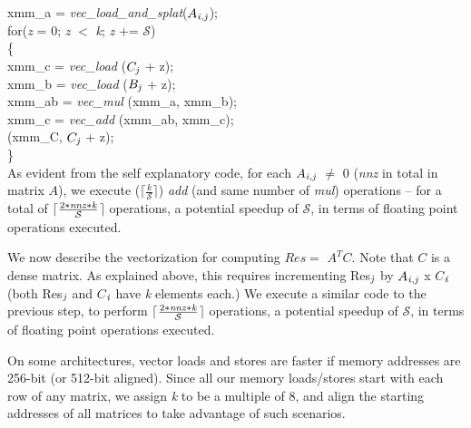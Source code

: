      \hspace*{-0.0in}xmm\_a = {\it{vec\_load\_and\_splat}}($A_{{\it{i}},{\it{j}}}$); \\
     for\hspace*{0.02in}({\it{z}} = 0; {\it{z}} $<$ {\it{k}}; {\it{z}} += $\mathcal{S}$)\\
     \{\\
         \hspace*{0.2in}xmm\_c = {\it{vec\_load}}  ($C_{{\it{j}}}$ + z); \\
         \hspace*{0.2in}xmm\_b = {\it{vec\_load}}  ($B_{{\it{j}}}$ + z); \\
         \hspace*{0.2in}xmm\_ab = {\it{vec\_mul}}  (xmm\_a, xmm\_b); \\
         \hspace*{0.2in}xmm\_c = {\it{vec\_add}}  (xmm\_ab, xmm\_c); \\
          (xmm\_C,  $C_{{\it{j}}}$ + z); \\
     \}\\

     As evident from the self explanatory code, for each
     $A_{{\it{i}},{\it{j}}}$ $\neq$ 0 ({\it{nnz}} in total in matrix $A$), 
     we execute ($\lceil$$\frac{k}{\mathcal{S}}$$\rceil$) 
     {\it{add}} (and same number of {\it{mul}}) operations -- for a
     total of
     $\lceil$$\frac{2*{\it{nnz}}*{\it{k}}}{\mathcal{S}}$$\rceil$ operations,
     a potential speedup of $\mathcal{S}$,  
     in terms of floating point operations executed.

     We now describe the vectorization for computing $Res =$ $A^TC$.
     Note that $C$ is a dense matrix. As explained above, this
     requires incrementing Res$_{{\it{j}}}$ 
     by $A_{{\it{i}},{\it{j}}}$ x $C$$_{{\it{i}}}$ 
     (both Res$_{{\it{j}}}$ and $C$$_{{\it{i}}}$ have {\it{k}} elements each.)
    We execute a similar code to the previous step, to perform 
    $\lceil$$\frac{2*{\it{nnz}}*{\it{k}}}{\mathcal{S}}$$\rceil$
    operations,
    a potential speedup of $\mathcal{S}$,
    in terms of floating point operations executed.

    On some architectures, vector loads and stores are faster if
    memory addresses are 256-bit (or 512-bit aligned). 
    Since all our memory loads/stores start with each row of any
    matrix, we assign {\it{k}}  to be a multiple of 8, and align the
    starting addresses of all matrices to take advantage of such
    scenarios.
    

